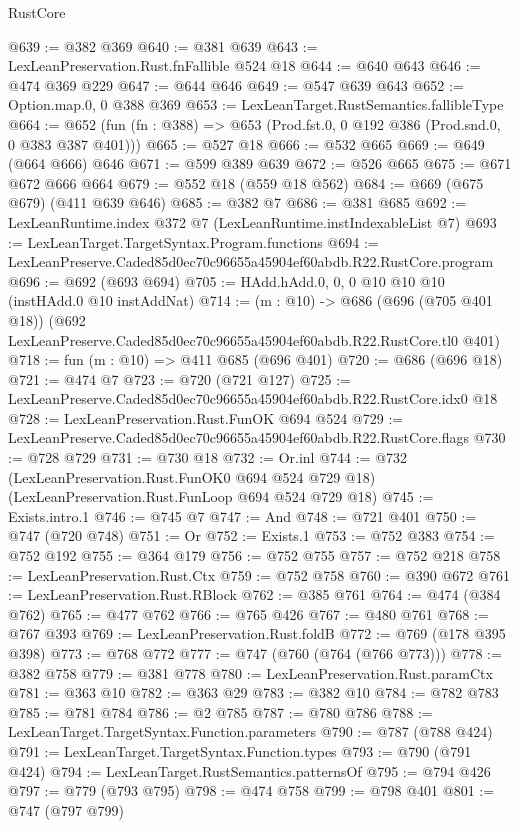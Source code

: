 \begin{lexlean}{RustCore}
\begin{coremodule}
@639 := @382 @369
@640 := @381 @639
@643 := LexLeanPreservation.Rust.fnFallible @524 @18
@644 := @640 @643
@646 := @474 @369 @229
@647 := @644 @646
@649 := @547 @639 @643
@652 := Option.map.{0, 0} @388 @369
@653 := LexLeanTarget.RustSemantics.fallibleType
@664 := @652 (fun (fn : @388) => @653 (Prod.fst.{0, 0} @192 @386 (Prod.snd.{0, 0} @383 @387 @401)))
@665 := @527 @18
@666 := @532 @665
@669 := @649 (@664 @666) @646
@671 := @599 @389 @639
@672 := @526 @665
@675 := @671 @672 @666 @664
@679 := @552 @18 (@559 @18 @562)
@684 := @669 (@675 @679) (@411 @639 @646)
@685 := @382 @7
@686 := @381 @685
@692 := LexLeanRuntime.index @372 @7 (LexLeanRuntime.instIndexableList @7)
@693 := LexLeanTarget.TargetSyntax.Program.functions
@694 := LexLeanPreserve.Caded85d0ec70c96655a45904ef60abdb.R22.RustCore.program
@696 := @692 (@693 @694)
@705 := HAdd.hAdd.{0, 0, 0} @10 @10 @10 (instHAdd.{0} @10 instAddNat)
@714 := (m : @10) ->
  @686
    (@696 (@705 @401 @18))
    (@692 LexLeanPreserve.Caded85d0ec70c96655a45904ef60abdb.R22.RustCore.tl0 @401)
@718 := fun (m : @10) => @411 @685 (@696 @401)
@720 := @686 (@696 @18)
@721 := @474 @7
@723 := @720 (@721 @127)
@725 := LexLeanPreserve.Caded85d0ec70c96655a45904ef60abdb.R22.RustCore.idx0 @18
@728 := LexLeanPreservation.Rust.FunOK @694 @524
@729 := LexLeanPreserve.Caded85d0ec70c96655a45904ef60abdb.R22.RustCore.flags
@730 := @728 @729
@731 := @730 @18
@732 := Or.inl
@744 := @732
    (LexLeanPreservation.Rust.FunOK0 @694 @524 @729 @18)
    (LexLeanPreservation.Rust.FunLoop @694 @524 @729 @18)
@745 := Exists.intro.{1}
@746 := @745 @7
@747 := And
@748 := @721 @401
@750 := @747 (@720 @748)
@751 := Or
@752 := Exists.{1}
@753 := @752 @383
@754 := @752 @192
@755 := @364 @179
@756 := @752 @755
@757 := @752 @218
@758 := LexLeanPreservation.Rust.Ctx
@759 := @752 @758
@760 := @390 @672
@761 := LexLeanPreservation.Rust.RBlock
@762 := @385 @761
@764 := @474 (@384 @762)
@765 := @477 @762
@766 := @765 @426
@767 := @480 @761
@768 := @767 @393
@769 := LexLeanPreservation.Rust.foldB
@772 := @769 (@178 @395 @398)
@773 := @768 @772
@777 := @747 (@760 (@764 (@766 @773)))
@778 := @382 @758
@779 := @381 @778
@780 := LexLeanPreservation.Rust.paramCtx
@781 := @363 @10
@782 := @363 @29
@783 := @382 @10
@784 := @782 @783
@785 := @781 @784
@786 := @2 @785
@787 := @780 @786
@788 := LexLeanTarget.TargetSyntax.Function.parameters
@790 := @787 (@788 @424)
@791 := LexLeanTarget.TargetSyntax.Function.types
@793 := @790 (@791 @424)
@794 := LexLeanTarget.RustSemantics.patternsOf
@795 := @794 @426
@797 := @779 (@793 @795)
@798 := @474 @758
@799 := @798 @401
@801 := @747 (@797 @799)

\end{coremodule}
\end{lexlean}
